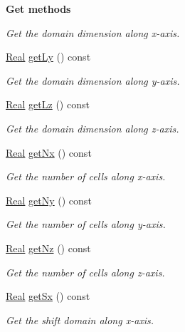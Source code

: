 \begin{Indent}{\bf Get methods}
\begin{DoxyCompactItemize}
\begin{DoxyCompactList}\small\item\em Get the domain dimension along x-\/axis. \end{DoxyCompactList}\item 
\hyperlink{namespaceFVCode3D_a40c1f5588a248569d80aa5f867080e83}{Real} \hyperlink{classFVCode3D_1_1Data_a48fce5455a3dc879fd55594e265c1bd9}{get\+Ly} () const 
\begin{DoxyCompactList}\small\item\em Get the domain dimension along y-\/axis. \end{DoxyCompactList}\item 
\hyperlink{namespaceFVCode3D_a40c1f5588a248569d80aa5f867080e83}{Real} \hyperlink{classFVCode3D_1_1Data_acca823b861efb66f390da61dbf64b605}{get\+Lz} () const 
\begin{DoxyCompactList}\small\item\em Get the domain dimension along z-\/axis. \end{DoxyCompactList}\item 
\hyperlink{namespaceFVCode3D_a40c1f5588a248569d80aa5f867080e83}{Real} \hyperlink{classFVCode3D_1_1Data_a1ede11ae84d5bd5328b0b35be6cb9cff}{get\+Nx} () const 
\begin{DoxyCompactList}\small\item\em Get the number of cells along x-\/axis. \end{DoxyCompactList}\item 
\hyperlink{namespaceFVCode3D_a40c1f5588a248569d80aa5f867080e83}{Real} \hyperlink{classFVCode3D_1_1Data_a021b187d234779a0e48e319ce301b78e}{get\+Ny} () const 
\begin{DoxyCompactList}\small\item\em Get the number of cells along y-\/axis. \end{DoxyCompactList}\item 
\hyperlink{namespaceFVCode3D_a40c1f5588a248569d80aa5f867080e83}{Real} \hyperlink{classFVCode3D_1_1Data_a1bf81146c1ecd38f18e23e2d8946ffde}{get\+Nz} () const 
\begin{DoxyCompactList}\small\item\em Get the number of cells along z-\/axis. \end{DoxyCompactList}\item 
\hyperlink{namespaceFVCode3D_a40c1f5588a248569d80aa5f867080e83}{Real} \hyperlink{classFVCode3D_1_1Data_aaf38dca37bfbdcf9316f98d51ebf9a0a}{get\+Sx} () const 
\begin{DoxyCompactList}\small\item\em Get the shift domain along x-\/axis. \end{DoxyCompactList}\item 

\end{DoxyCompactItemize}
\end{Indent}
